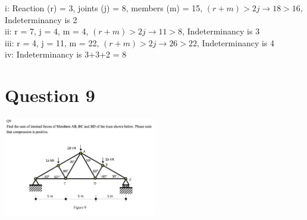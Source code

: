 \documentclass{article}
\begin{document}
i: Reaction (r) = 3, joints (j) = 8, members (m) = 15, $(r+m)>2j\to 18>16$, Indeterminancy is 2\\
ii: r = 7, j = 4, m = 4, $(r+m)>2j\to 11>8$, Indeterminancy is 3\\
iii: r = 4, j = 11, m = 22, $(r+m)>2j\to 26>22$, Indeterminancy is 4\\
iv: Indeterminancy is 3+3+2 = 8\\

\section*{Question 9}
\begin{center}
    \includegraphics[width=0.5\textwidth]{img/2-7.jpg}
\end{center}
\end{document}
